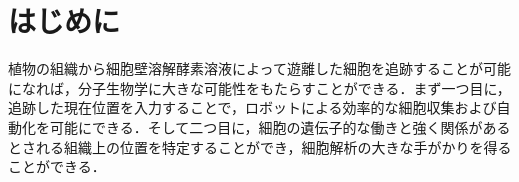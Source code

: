\section{はじめに}

植物の組織から細胞壁溶解酵素溶液によって遊離した細胞を追跡することが可能になれば，分子生物学に大きな可能性をもたらすことができる．まず一つ目に，追跡した現在位置を入力することで，ロボットによる効率的な細胞収集および自動化を可能にできる．そして二つ目に，細胞の遺伝子的な働きと強く関係があるとされる組織上の位置を特定することができ，細胞解析の大きな手がかりを得ることができる．